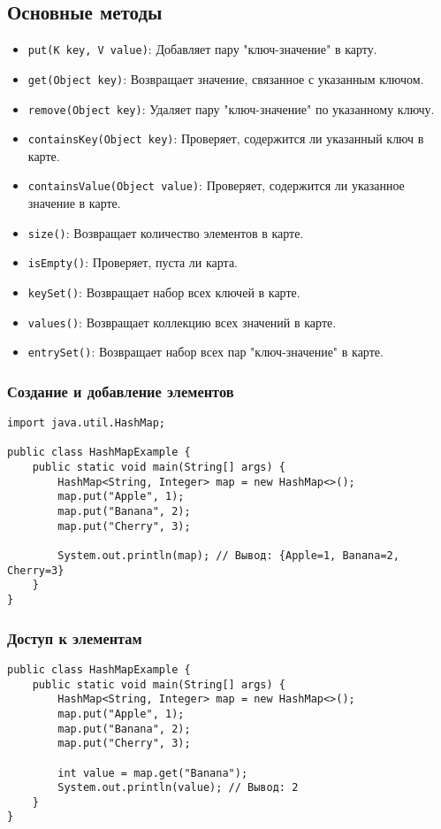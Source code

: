 \documentclass[12pt, a4paper]{article}
\begin{document}
\subsection*{Основные методы}
\begin{itemize}
    \item \texttt{put(K key, V value)}: Добавляет пару "ключ-значение" в карту.
    \item \texttt{get(Object key)}: Возвращает значение, связанное с указанным ключом.
    \item \texttt{remove(Object key)}: Удаляет пару "ключ-значение" по указанному ключу.
    \item \texttt{containsKey(Object key)}: Проверяет, содержится ли указанный ключ в карте.
    \item \texttt{containsValue(Object value)}: Проверяет, содержится ли указанное значение в карте.
    \item \texttt{size()}: Возвращает количество элементов в карте.
    \item \texttt{isEmpty()}: Проверяет, пуста ли карта.
    \item \texttt{keySet()}: Возвращает набор всех ключей в карте.
    \item \texttt{values()}: Возвращает коллекцию всех значений в карте.
    \item \texttt{entrySet()}: Возвращает набор всех пар "ключ-значение" в карте.
\end{itemize}

\subsubsection*{Создание и добавление элементов}
\begin{verbatim}
import java.util.HashMap;

public class HashMapExample {
    public static void main(String[] args) {
        HashMap<String, Integer> map = new HashMap<>();
        map.put("Apple", 1);
        map.put("Banana", 2);
        map.put("Cherry", 3);

        System.out.println(map); // Вывод: {Apple=1, Banana=2, Cherry=3}
    }
}
\end{verbatim}

\subsubsection*{Доступ к элементам}
\begin{verbatim}
public class HashMapExample {
    public static void main(String[] args) {
        HashMap<String, Integer> map = new HashMap<>();
        map.put("Apple", 1);
        map.put("Banana", 2);
        map.put("Cherry", 3);

        int value = map.get("Banana");
        System.out.println(value); // Вывод: 2
    }
}
\end{verbatim}
\end{document}
